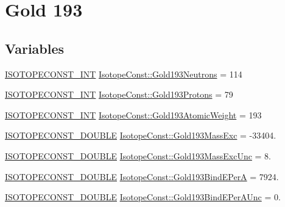 \hypertarget{group___isotope_const-_gold-_au193}{}\section{Gold 193}
\label{group___isotope_const-_gold-_au193}
\subsection*{Variables}
\begin{DoxyCompactItemize}
\item 
\mbox{\hyperlink{group___isotope_const-_macros_ga5f18360b3e99483a35c32d789e62621c}{I\+S\+O\+T\+O\+P\+E\+C\+O\+N\+S\+T\+\_\+\+I\+NT}} \mbox{\hyperlink{group___isotope_const-_gold-_au193_gafc6fdbee56c0363b1570e51fbf160961}{Isotope\+Const\+::\+Gold193\+Neutrons}} = 114
\item 
\mbox{\hyperlink{group___isotope_const-_macros_ga5f18360b3e99483a35c32d789e62621c}{I\+S\+O\+T\+O\+P\+E\+C\+O\+N\+S\+T\+\_\+\+I\+NT}} \mbox{\hyperlink{group___isotope_const-_gold-_au193_ga8455d940a466704d358e8f441dc4feff}{Isotope\+Const\+::\+Gold193\+Protons}} = 79
\item 
\mbox{\hyperlink{group___isotope_const-_macros_ga5f18360b3e99483a35c32d789e62621c}{I\+S\+O\+T\+O\+P\+E\+C\+O\+N\+S\+T\+\_\+\+I\+NT}} \mbox{\hyperlink{group___isotope_const-_gold-_au193_gac4746add5e0c0b0ef5fca905ab68be13}{Isotope\+Const\+::\+Gold193\+Atomic\+Weight}} = 193
\item 
\mbox{\hyperlink{group___isotope_const-_macros_ga8f45a7272ce02c0b4c65c44636ed719a}{I\+S\+O\+T\+O\+P\+E\+C\+O\+N\+S\+T\+\_\+\+D\+O\+U\+B\+LE}} \mbox{\hyperlink{group___isotope_const-_gold-_au193_ga1ed1691c25adc4d227cf020d063a64f4}{Isotope\+Const\+::\+Gold193\+Mass\+Exc}} = -\/33404.
\item 
\mbox{\hyperlink{group___isotope_const-_macros_ga8f45a7272ce02c0b4c65c44636ed719a}{I\+S\+O\+T\+O\+P\+E\+C\+O\+N\+S\+T\+\_\+\+D\+O\+U\+B\+LE}} \mbox{\hyperlink{group___isotope_const-_gold-_au193_gab938bd10eb0ed749f316bc9cb57249c6}{Isotope\+Const\+::\+Gold193\+Mass\+Exc\+Unc}} = 8.
\item 
\mbox{\hyperlink{group___isotope_const-_macros_ga8f45a7272ce02c0b4c65c44636ed719a}{I\+S\+O\+T\+O\+P\+E\+C\+O\+N\+S\+T\+\_\+\+D\+O\+U\+B\+LE}} \mbox{\hyperlink{group___isotope_const-_gold-_au193_gaa7ae3b85cabef3f0eac2685526d32bee}{Isotope\+Const\+::\+Gold193\+Bind\+E\+PerA}} = 7924.
\item 
\mbox{\hyperlink{group___isotope_const-_macros_ga8f45a7272ce02c0b4c65c44636ed719a}{I\+S\+O\+T\+O\+P\+E\+C\+O\+N\+S\+T\+\_\+\+D\+O\+U\+B\+LE}} \mbox{\hyperlink{group___isotope_const-_gold-_au193_gaa5ccc277d1e214367cb93ad0c2c9d226}{Isotope\+Const\+::\+Gold193\+Bind\+E\+Per\+A\+Unc}} = 0.

\end{DoxyCompactItemize}

